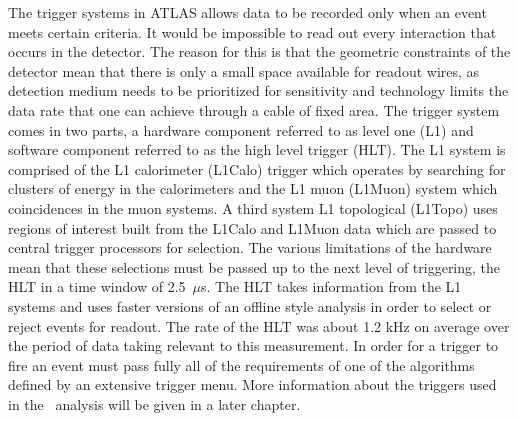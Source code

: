 The trigger systems in ATLAS allows data to be recorded only when an event meets
certain criteria. It would be impossible to read out every interaction that
occurs in the detector. The reason for this is that the geometric constraints of
the detector mean that there is only a small space available for readout wires,
as detection medium needs to be prioritized for sensitivity and technology
limits the data rate that one can achieve through a cable of fixed area. The
trigger system comes in two parts, a hardware component referred to as level one
(L1) and software component referred to as the high level trigger (HLT). The L1
system is comprised of the L1 calorimeter (L1Calo) trigger which operates by
searching for clusters of energy in the calorimeters and the L1 muon (L1Muon)
system which coincidences in the muon systems. A third system L1 topological
(L1Topo) uses regions of interest built from the L1Calo and L1Muon data which
are passed to central trigger processors for selection. The various limitations
of the hardware mean that these selections must be passed up to the next level
of triggering, the HLT in a time window of 2.5~$\mu$s. The HLT takes information
from the L1 systems and uses faster versions of an offline style analysis in
order to select or reject events for readout. The rate of the HLT was about 1.2
kHz on average over the period of data taking relevant to this measurement. In
order for a trigger to fire an event must pass fully all of the requirements of
one of the algorithms defined by an extensive trigger menu. More information
about the triggers used in the \VHbb\ analysis will be given in a later chapter.
